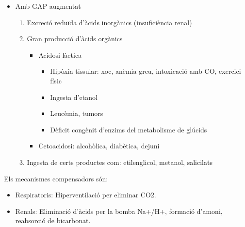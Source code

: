 \begin{itemize}
\item Amb GAP augmentat
  \begin{enumerate}
  \item Excreció reduïda d'àcids inorgànics (insuficiència renal)
  \item Gran producció d'àcids orgànics
    \begin{itemize}
    \item Acidosi làctica
      \begin{itemize}
      \item Hipòxia tissular: xoc, anèmia greu, intoxicació amb CO,
        exercici físic
      \item Ingesta d'etanol
      \item Leucèmia, tumors
      \item Dèficit congènit d'enzims del metabolisme de glúcids
      \end{itemize}
    \item Cetoacidosi: alcohòlica, diabètica, dejuni
    \end{itemize}
  \item Ingesta de certs productes com: etilenglicol, metanol, salicilats
  \end{enumerate}
\end{itemize}

Els mecanismes compensadors són:
\begin{itemize}
\item Respiratoris: Hiperventilació per eliminar CO2.
\item Renals: Eliminació d'àcids per la bomba Na+/H+, formació
  d'amoni, reabsorció de bicarbonat.
\end{itemize}

